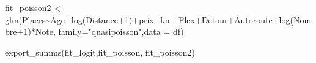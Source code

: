 \documentclass[
]{book}
\newenvironment{Shaded}{\begin{snugshade}}{\end{snugshade}}
\newcommand{\AttributeTok}[1]{\textcolor[rgb]{0.77,0.63,0.00}{#1}}
\newcommand{\DecValTok}[1]{\textcolor[rgb]{0.00,0.00,0.81}{#1}}
\newcommand{\FunctionTok}[1]{\textcolor[rgb]{0.00,0.00,0.00}{#1}}
\newcommand{\NormalTok}[1]{#1}
\newcommand{\OtherTok}[1]{\textcolor[rgb]{0.56,0.35,0.01}{#1}}
\newcommand{\SpecialCharTok}[1]{\textcolor[rgb]{0.00,0.00,0.00}{#1}}
\newcommand{\StringTok}[1]{\textcolor[rgb]{0.31,0.60,0.02}{#1}}
\begin{document}
\begin{Shaded}
\begin{Highlighting}[]
\NormalTok{fit\_poisson2 }\OtherTok{\textless{}{-}} \FunctionTok{glm}\NormalTok{(Places}\SpecialCharTok{\textasciitilde{}}\NormalTok{Age}\SpecialCharTok{+}\FunctionTok{log}\NormalTok{(Distance}\SpecialCharTok{+}\DecValTok{1}\NormalTok{)}\SpecialCharTok{+}\NormalTok{prix\_km}\SpecialCharTok{+}\NormalTok{Flex}\SpecialCharTok{+}\NormalTok{Detour}\SpecialCharTok{+}\NormalTok{Autoroute}\SpecialCharTok{+}\FunctionTok{log}\NormalTok{(Nombre}\SpecialCharTok{+}\DecValTok{1}\NormalTok{)}\SpecialCharTok{*}\NormalTok{Note, }\AttributeTok{family=}\StringTok{"quasipoisson"}\NormalTok{,}\AttributeTok{data =}\NormalTok{ df)}

\FunctionTok{export\_summs}\NormalTok{(fit\_logit,fit\_poisson, fit\_poisson2)}
\end{Highlighting}
\end{Shaded}

 
  \providecommand{\huxb}[2]{\arrayrulecolor[RGB]{#1}\global\arrayrulewidth=#2pt}
  \providecommand{\huxvb}[2]{\color[RGB]{#1}\vrule width #2pt}
  \providecommand{\huxtpad}[1]{\rule{0pt}{#1}}
  \providecommand{\huxbpad}[1]{\rule[-#1]{0pt}{#1}}
\end{document}
